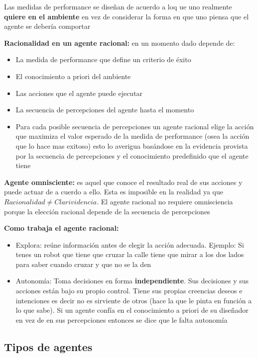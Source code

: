 Las medidas de performance se diseñan de acuerdo a loq ue uno realmente \textbf{quiere en el ambiente} en vez de considerar la forma en que uno piensa que el agente se debería comportar

\textbf{Racionalidad en un agente racional: }en un momento dado depende de:
\begin{itemize}
  \item La medida de performance que define un criterio de éxito
  \item El conocimiento a priori del ambiente
  \item Las acciones que el agente puede ejecutar
  \item La secuencia de percepciones del agente hasta el momento
  \item Para cada posible secuencia de percepciones un agente racional elige la acción que maximiza el valor esperado de la medida de performance (osea la acción que lo hace mas exitoso) esto lo averigua basándose en la evidencia provista por la secuencia de percepciones y el conocimiento predefinido que el agente tiene
\end{itemize}

\textbf{Agente omnisciente: }es aquel que conoce el resultado real de sus acciones y puede actuar de a cuerdo a ello. Esta es imposible en la realidad ya que $Racionalidad \neq Clarividencia$. El agente racional no requiere omnisciencia porque la elección racional depende de la secuencia de percepciones

\textbf{Como trabaja el agente racional:}
\begin{itemize}
  \item Explora: reúne información antes de elegir la acción adecuada. Ejemplo: Si tenes un robot que tiene que cruzar la calle tiene que mirar a los dos lados para saber cuando cruzar y que no se la den
  \item Autonomía: Toma decisiones en forma \textbf{independiente}. Sus decisiones y sus acciones están bajo su propio control. Tiene sus propias creencias deseos e intenciones es decir no es sirviente de otros (hace la que le pinta en función a lo que sabe). Si un agente confía en el conocimiento a priori de su diseñador en vez de en sus percepciones entonces se dice que le falta autonomía 
\end{itemize}

\subsection*{Tipos de agentes}
